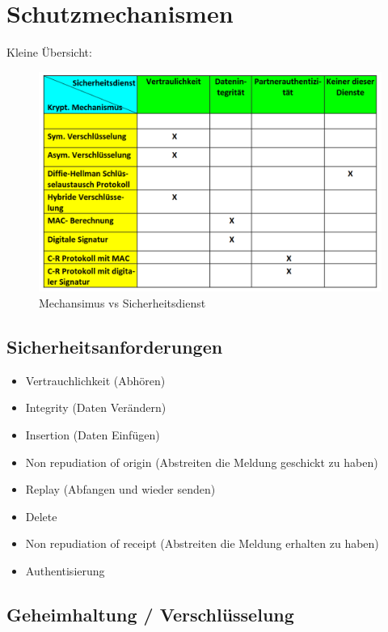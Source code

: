 \documentclass[12pt]{scrartcl}
\begin{document}
\newpage
\section{Schutzmechanismen}

Kleine Übersicht:
\begin{figure}[ht]
    \centering
    \includegraphics[width=\textwidth]{img/mechanismus_vs_sicherheitsdienst.png}
    \caption{Mechansimus vs Sicherheitsdienst}
    \label{fig:mechanismus_vs_sicherheitsdienst}
\end{figure}

\subsection{Sicherheitsanforderungen}

\begin{itemize}
    \item Vertrauchlichkeit (Abhören)
    \item Integrity (Daten Verändern)
    \item Insertion (Daten Einfügen)
    \item Non repudiation of origin (Abstreiten die Meldung geschickt zu haben)
    \item Replay (Abfangen und wieder senden)
    \item Delete 
    \item Non repudiation of receipt (Abstreiten die Meldung erhalten zu haben)
    \item Authentisierung
\end{itemize}

\subsection{Geheimhaltung / Verschlüsselung}
\end{document}
